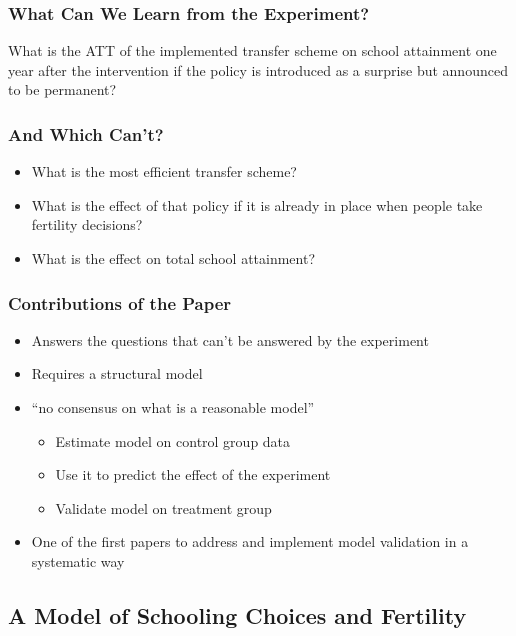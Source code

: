 \documentclass[11pt]{beamer}
\begin{document}
\begin{frame}[c]\frametitle{What Can We Learn from the Experiment?}
\pause
What is the ATT of the implemented transfer scheme on school attainment \pause one year after the intervention \pause if the policy is introduced as a surprise  \pause but announced to be permanent?
\end{frame}


\begin{frame}[c]\frametitle{And Which Can't?}
\begin{itemize}
    \item What is the most \alert{efficient transfer scheme}?
    \item What is the effect of that policy if it is already \alert{in place when people take fertility decisions}?
    \item What is the effect on \alert{total school attainment}?
\end{itemize}
\end{frame}


\begin{frame}[c]\frametitle{Contributions of the Paper}
\begin{itemize}
    \item Answers the questions that can't be answered by the experiment
    \item Requires a structural model
    \item ``no consensus on what is a reasonable model''
    \begin{itemize}
        \item Estimate model on control group data
        \item Use it to predict the effect of the experiment
        \item Validate model on treatment group
    \end{itemize}
    \item One of the first papers to address and implement model validation in a systematic way
\end{itemize}
\end{frame}


\subsection{A Model of Schooling Choices and Fertility}
\end{document}
